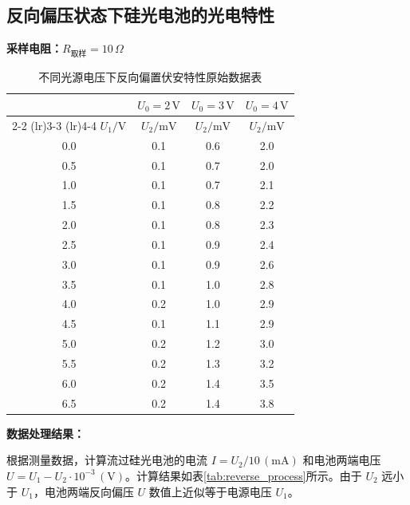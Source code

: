 \documentclass[11pt]{article}
\begin{document}
\subsection{反向偏压状态下硅光电池的光电特性}

\textbf{采样电阻：$R_{\text{取样}} = 10\,\Omega$}

\begin{table}[htbp]
    \centering
    \caption{不同光源电压下反向偏置伏安特性原始数据表}
    \begin{tabular}{c|c|c|c}
        \toprule
        & $U_0 = 2\,\text{V}$ & $U_0 = 3\,\text{V}$ & $U_0 = 4\,\text{V}$ \\
        \cmidrule(lr){2-2} \cmidrule(lr){3-3} \cmidrule(lr){4-4}
        $U_1 / \text{V}$ & $U_2 / \text{mV}$ & $U_2 / \text{mV}$ & $U_2 / \text{mV}$ \\
        \midrule
        0.0  & 0.1 & 0.6 & 2.0 \\
        0.5  & 0.1 & 0.7 & 2.0 \\
        1.0  & 0.1 & 0.7 & 2.1 \\
        1.5  & 0.1 & 0.8 & 2.2 \\
        2.0  & 0.1 & 0.8 & 2.3 \\
        2.5  & 0.1 & 0.9 & 2.4 \\
        3.0  & 0.1 & 0.9 & 2.6 \\
        3.5  & 0.1 & 1.0 & 2.8 \\
        4.0  & 0.2 & 1.0 & 2.9 \\
        4.5  & 0.1 & 1.1 & 2.9 \\
        5.0  & 0.2 & 1.2 & 3.0 \\
        5.5  & 0.2 & 1.3 & 3.2 \\
        6.0  & 0.2 & 1.4 & 3.5 \\
        6.5  & 0.2 & 1.4 & 3.8 \\
        \bottomrule
    \end{tabular}
\end{table}

\textbf{数据处理结果：}

根据测量数据，计算流过硅光电池的电流 $I = U_2 / 10 \, (\text{mA})$ 和电池两端电压 $U = U_1 - U_2 \cdot 10^{-3} \, (\text{V})$。计算结果如表\ref{tab:reverse_process}所示。由于 $U_2$ 远小于 $U_1$，电池两端反向偏压 $U$ 数值上近似等于电源电压 $U_1$。
\end{document}
